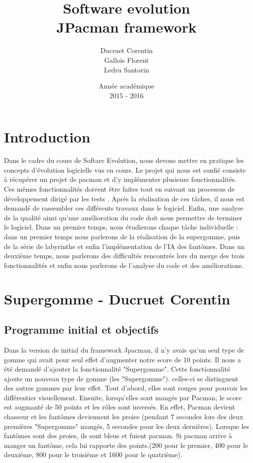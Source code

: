 \documentclass[a4paper,12pt]{report} %
\title{Software evolution \\ JPacman framework}
\author{Ducruet Corentin \\ Gallois Florent \\ Ledru Santorin}
\date{Année académique\\2015 - 2016}
\begin{document}
 
\maketitle
\newpage 
{} %
\tableofcontents
\newpage
\section{Introduction}

Dans le cadre du cours de Softare Evolution, nous devons mettre en pratique les concepts d'évolution logicielle vus en cours. Le projet qui nous est confié consiste à récupérer un projet de pacman et d'y implémenter plusieurs fonctionnalités. Ces mêmes fonctionnalités doivent être faites tout en suivant un processus de développement dirigé par les tests . Après la réalisation de ces tâches, il nous est demandé de rassembler ces différents travaux dans le logiciel. Enfin, une analyse de la qualité ainsi qu'une amélioration du code doit nous permettre de terminer le logiciel.
Dans un premier temps, nous étudierons chaque tâche individuelle : dans un premier temps nous parlerons de la réalisation de la supergomme, puis de la série de labyrinthe et enfin l'implémentation de l'IA des fantômes.
Dans un deuxième temps, nous parlerons des difficultés rencontrés lors du merge des trois fonctionnalités et enfin nous parlerons de l'analyse du code et des améliorations.

\section{Supergomme - Ducruet Corentin}
\subsection{Programme initial et objectifs}
Dans la version de initial du framework Jpacman, il n'y avais qu'un seul type de gomme qui avait pour seul effet d'augmenter notre score de 10 points. Il nous a été demandé d'ajouter la fonctionnalité "Supergomme". Cette fonctionnalité ajoute un nouveau type de gomme (les "Supergomme"). celles-ci se distinguent des autres gommes par leur effet. Tout d'abord, elles sont rouges pour pouvoir les différentier visuellement. Ensuite, lorsqu'elles sont mangés par Pacman, le score est augmanté de 50 points et les rôles sont inversés. En effet, Pacman devient chasseur et les fantômes deviennent les proies (pendant 7 secondes lors des deux premières "Supergomme" mangés, 5 secondes pour les deux dernières). Lorsque les fantômes sont des proies, ils sont bleus et fuient pacman. Si pacman arrive à manger un fantôme, cela lui rapporte des points.(200 pour le premier, 400 pour le deuxième, 800 pour le troisième et 1600 pour le quatrième).
\end{document}
